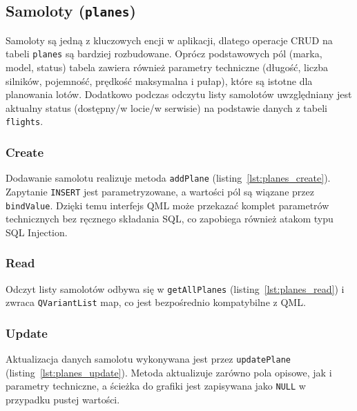 \documentclass[fleqn,onecolumn,a4paper,12pt,titlepage]{article}
\begin{document}
\subsection{Samoloty (\texttt{planes})}

Samoloty są jedną z kluczowych encji w aplikacji, dlatego operacje CRUD na tabeli \texttt{planes} są bardziej rozbudowane. Oprócz podstawowych pól (marka, model, status) tabela zawiera również parametry techniczne (długość, liczba silników, pojemność, prędkość maksymalna i pułap), które są istotne dla planowania lotów. Dodatkowo podczas odczytu listy samolotów uwzględniany jest aktualny status (dostępny/w locie/w serwisie) na podstawie danych z tabeli \texttt{flights}.

\subsubsection{Create}

Dodawanie samolotu realizuje metoda \texttt{addPlane} (listing~\ref{lst:planes_create}). Zapytanie \texttt{INSERT} jest parametryzowane, a wartości pól są wiązane przez \texttt{bindValue}. Dzięki temu interfejs QML może przekazać komplet parametrów technicznych bez ręcznego składania SQL, co zapobiega również atakom typu SQL Injection.



\subsubsection{Read}

Odczyt listy samolotów odbywa się w \texttt{getAllPlanes} (listing~\ref{lst:planes_read}) i zwraca \texttt{QVariantList} map, co jest bezpośrednio kompatybilne z QML.



\subsubsection{Update}

Aktualizacja danych samolotu wykonywana jest przez \texttt{updatePlane} (listing~\ref{lst:planes_update}). Metoda aktualizuje zarówno pola opisowe, jak i parametry techniczne, a ścieżka do grafiki jest zapisywana jako \texttt{NULL} w przypadku pustej wartości.
\end{document}
